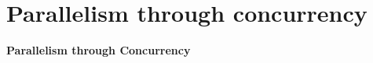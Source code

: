 \documentclass{beamer}
\begin{document}

\section{Parallelism through concurrency}

\begin{frame}

\begin{center}
\Large
\textbf{Parallelism through Concurrency}
\end{center}

\end{frame}
\end{document}
